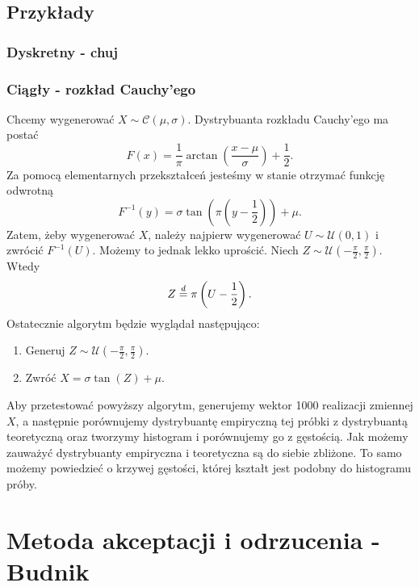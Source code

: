\documentclass[12pt]{mwrep}
\begin{document}
	\subsection{Przykłady}
	\subsubsection{Dyskretny - chuj}
	\subsubsection{Ciągły - rozkład Cauchy'ego}
	\noindent Chcemy wygenerować $ X \sim \mathcal{C}(\mu, \sigma) $. 
	Dystrybuanta rozkładu Cauchy'ego ma postać
	$$ F(x) = \frac{1}{\pi} \arctan{\left(\frac{x - \mu}{\sigma}\right)} + \frac{1}{2}. $$
	Za pomocą elementarnych przekształceń jesteśmy w stanie otrzymać funkcję odwrotną
	$$ F^{-1}(y) = \sigma \tan \left(\pi \left(y - \frac{1}{2}\right) \right) + \mu. $$
	Zatem, żeby wygenerować $X$, należy najpierw wygenerować $U \sim \mathcal{U}(0, 1) $ i zwrócić $F^{-1}(U)$. Możemy to jednak lekko uprościć. Niech $ Z \sim \mathcal{U}\left(-\frac{\pi}{2}, \frac{\pi}{2}\right) $. Wtedy
	$$ Z \buildrel{d}\over{=} \pi \left(U - \frac{1}{2}\right). $$
	Ostatecznie algorytm będzie wyglądał następująco:
	\begin{enumerate}
		\item Generuj $Z \sim \mathcal{U}\left(-\frac{\pi}{2}, \frac{\pi}{2}\right)$.
		\item Zwróć $ X = \sigma \tan(Z) + \mu $.
	\end{enumerate}
	Aby przetestować powyższy algorytm, generujemy wektor 1000 realizacji zmiennej $X$, a następnie porównujemy dystrybuantę empiryczną tej próbki z dystrybuantą teoretyczną oraz tworzymy histogram i porównujemy go z gęstością.
	Jak możemy zauważyć dystrybuanty empiryczna i teoretyczna są do siebie zbliżone. To samo możemy powiedzieć o krzywej gęstości, której kształt jest podobny do histogramu próby.



	
	\section{Metoda akceptacji i odrzucenia\textsuperscript{\cite{AO - dyskretny}} - Budnik}
\end{document}
